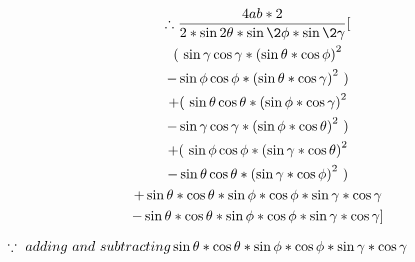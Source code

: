 \documentclass[journal,12pt,twocolumn]{IEEEtran}
\begin{document}

\noindent
\begin{multline*}
        \therefore \frac{4ab*2}{2*\sin2\theta*\sin\2\phi*\sin\2\gamma}[ \\ 
        (~\sin\gamma\cos\gamma* \left( \sin\theta*\cos\phi \right)^2 \\-\sin\phi\cos\phi* \left( \sin\theta*\cos\gamma \right)^2~)\\+   
        (~\sin\theta\cos\theta* \left( \sin\phi*\cos\gamma \right)^2 \\-\sin\gamma\cos\gamma* \left( \sin\phi*\cos\theta \right)^2~)\\+
        (~\sin\phi\cos\phi* \left( \sin\gamma*\cos\theta \right)^2 \\-\sin\theta\cos\theta* \left( \sin\gamma*\cos\phi \right)^2~)\\+
        \sin\theta*\cos\theta*\sin\phi*\cos\phi*\sin\gamma*\cos\gamma \\- \sin\theta*\cos\theta*\sin\phi*\cos\phi*\sin\gamma*\cos\gamma
        ]
\end{multline*}
\begin{flushright}
$\because ~adding ~and ~ subtracting \sin\theta*\cos\theta*\\*\sin\phi*\cos\phi*\sin\gamma*\cos\gamma $
\end{flushright}
\end{document}
